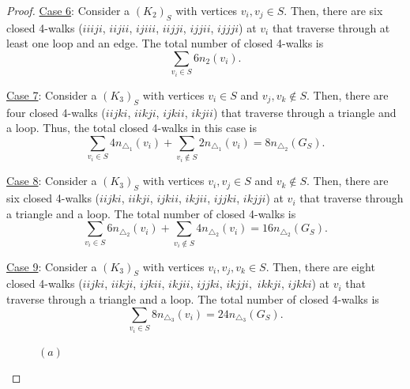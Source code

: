 \documentclass[12pt,a4paper,reqno]{amsart}
\numberwithin{equation}{section}
\theoremstyle{plain}
\theoremstyle{definition}
\newcommand{\<}{\langle}
\renewcommand{\>}{\rangle}
\begin{document}
\begin{proof}
\underline{Case 6}:
Consider a $(K_2)_S$ with vertices $v_i, v_j \in S$. Then, there are six closed 4-walks ($iiiji$, $iijii$, $ijiii$, $iijji$, $ijjii$, $ijjji$) at $v_i$ that traverse through at least one loop and an edge. The total number of closed 4-walks is 
\[
\sum_{v_i \in S} 6n_2(v_i).
\]

\underline{Case 7}:
Consider a $(K_3)_S$ with vertices $v_i \in S$ and $v_j,v_k \notin S.$ Then, there are four closed 4-walks ($iijki$, $iikji$, $ijkii$, $ikjii$) that traverse through a triangle and a loop.
Thus, the total closed 4-walks in this case is 
\[
\sum_{v_i \in S} 4 n_{\triangle_1}(v_i) + \sum_{v_i \notin S} 2n_{\triangle_1}(v_i) = 8n_{\triangle_2}(G_S).
\] 
\vspace{0.2em}

\underline{Case 8}:
Consider a $(K_3)_S$ with vertices $v_i, v_j \in S$ and $v_k \notin S.$ Then, there are six closed 4-walks ($iijki$, $iikji$, $ijkii$, $ikjii$, $ijjki$, $ikjji$) at $v_i$ that traverse through a triangle and a loop.  The total number of closed 4-walks is 
\[
\sum_{v_i \in S} 6 n_{\triangle_2}(v_i) + \sum_{v_i \notin S} 4n_{\triangle_2}(v_i) = 16n_{\triangle_2}(G_S).
\] 
\vspace{0.2em}

\underline{Case 9}:
Consider a $(K_3)_S$ with vertices $v_i, v_j, v_k \in S.$ Then, there are eight closed 4-walks ($iijki$, $iikji$, $ijkii$, $ikjii$, $ijjki$, $ikjji,$ $ikkji$, $ijkki$) at $v_i$ that traverse through a triangle and a loop. The total number of closed 4-walks is 
\[
\sum_{v_i \in S} 8 n_{\triangle_3}(v_i) = 24 n_{\triangle_3}(G_S).
\] 


\begin{figure}[h]
\vspace{-1em}
\begin{minipage}[b]{0.23\linewidth}
    \centering
    \caption*{$(a)$}
    \end{minipage}
\begin{minipage}[b]{0.23\linewidth}
    \centering
\end{minipage}
\end{figure}
\end{proof}
\end{document}
